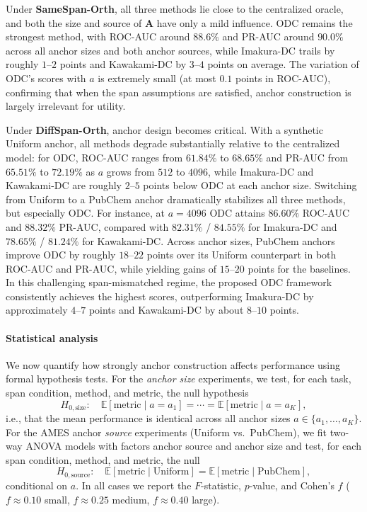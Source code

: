 \documentclass[final,3p,times]{elsarticle}
\theoremstyle{plain}
\newcommand{\matr}[1]{\bm{#1}}        %
\begin{document}
Under \textbf{SameSpan-Orth}, all three methods lie close to the centralized oracle, and both the size and source of $\matr{A}$ have only a mild influence. ODC remains the strongest method, with ROC-AUC around $88.6\%$ and PR-AUC around $90.0\%$ across all anchor sizes and both anchor sources, while Imakura-DC trails by roughly
$1$–$2$ points and Kawakami-DC by $3$–$4$ points on average. The variation of ODC’s scores with $a$ is extremely small (at most $0.1$ points in ROC-AUC), confirming that when the span assumptions are satisfied, anchor construction is largely irrelevant for utility.

Under \textbf{DiffSpan-Orth}, anchor design becomes critical. With a synthetic Uniform anchor, all methods degrade substantially relative to the centralized model: for ODC, ROC-AUC ranges from $61.84\%$ to $68.65\%$ and PR-AUC from $65.51\%$ to $72.19\%$ as $a$ grows from $512$ to $4096$, while Imakura-DC and Kawakami-DC are roughly
$2$–$5$ points below ODC at each anchor size. Switching from Uniform to a PubChem anchor dramatically stabilizes all three methods, but especially ODC. For instance, at $a=4096$ ODC attains $86.60\%$ ROC-AUC and $88.32\%$ PR-AUC, compared with $82.31\%$ / $84.55\%$ for Imakura-DC and $78.65\%$ / $81.24\%$ for Kawakami-DC. Across anchor sizes, PubChem anchors improve ODC by roughly $18$–$22$ points over its Uniform counterpart in both ROC-AUC and PR-AUC, while yielding gains of $15$–$20$ points for the baselines. In this challenging span-mismatched regime, the proposed ODC framework consistently achieves the highest scores, outperforming Imakura-DC by approximately $4$–$7$ points and Kawakami-DC by about $8$–$10$ points.


\paragraph{Statistical analysis}
We now quantify how strongly anchor construction affects performance using formal hypothesis tests. For the \emph{anchor size} experiments, we test, for each task, span condition, method, and metric, the null hypothesis
\begin{equation}
H_{0,\text{size}}:\quad
\mathbb{E}[\text{metric} \mid a = a_1]
= \cdots =
\mathbb{E}[\text{metric} \mid a = a_K],
\end{equation}
i.e., that the mean performance is identical across all anchor sizes $a\in\{a_1,\dots,a_K\}$. For the AMES anchor \emph{source} experiments (Uniform vs.\ PubChem), we fit two-way ANOVA models with factors anchor source and anchor size and test, for each span condition, method, and metric, the null
\begin{equation}
H_{0,\text{source}}:\quad
\mathbb{E}[\text{metric} \mid \text{Uniform}]
=
\mathbb{E}[\text{metric} \mid \text{PubChem}],
\end{equation}
conditional on $a$. In all cases we report the $F$-statistic, $p$-value, and Cohen's $f$
($f\approx 0.10$ small, $f\approx 0.25$ medium, $f\approx 0.40$ large).
\end{document}
